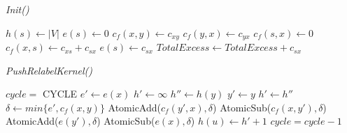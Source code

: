         
        \begin{algorithm}
            \caption{\textit{Init()}}\label{alg:parallel-init}
            \begin{algorithmic}
                \State $h(s) \gets |V|$
                \State $e(s) \gets 0$
                    \State $c_f(x,y) \gets c_{xy}$
                    \State $c_f(y,x) \gets c_{yx}$
                \EndFor
                    \State $c_f(s,x) \gets 0$
                    \State $c_f(x,s) \gets c_{xs} + c_{sx}$
                    \State $e(s) \gets c_{sx}$
                    \State $TotalExcess \gets TotalExcess + c_{sx}$
                \EndFor
            \end{algorithmic}
        \end{algorithm}

        \begin{algorithm}
            \caption{\textit{PushRelabelKernel()}}\label{alg:parallel-pr-kernel}
            \begin{algorithmic}
                \State $cycle =$ CYCLE
                        \State $e' \gets e(x)$
                        \State $h' \gets \infty$
                            \State $h'' \gets h(y)$
                                \State $y' \gets y$
                                \State $h' \gets h''$
                            \EndIf
                        \EndFor
                         \qquad {}
                            \State $\delta \gets min\{e', c_f(x,y)\}$
                            \State AtomicAdd($c_f(y',x), \delta$)
                            \State AtomicSub($c_f(x,y'), \delta$)
                            \State AtomicAdd($e(y'), \delta$)
                            \State AtomicSub($e(x), \delta$)
                        \Else \qquad {}
                            \State $h(u) \gets h' + 1$
                        \EndIf
                    \EndIf
                    \State $cycle = cycle - 1$
                \EndWhile
            \end{algorithmic}
        \end{algorithm}
    
